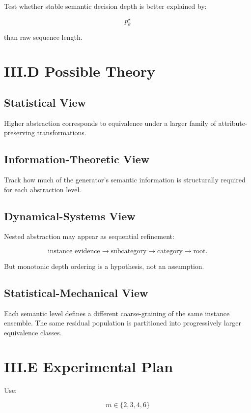 \documentclass[10pt]{article}
\begin{document}
Test whether stable semantic decision depth is better explained by:

\[
p_k^\star
\]

than raw sequence length.

\section{III.D Possible Theory}

\subsection{Statistical View}

Higher abstraction corresponds to equivalence under a larger family of attribute-preserving transformations.

\subsection{Information-Theoretic View}

Track how much of the generator's semantic information is structurally required for each abstraction level.

\subsection{Dynamical-Systems View}

Nested abstraction may appear as sequential refinement:

\[
\text{instance evidence}
\rightarrow
\text{subcategory}
\rightarrow
\text{category}
\rightarrow
\text{root}.
\]

But monotonic depth ordering is a hypothesis, not an assumption.

\subsection{Statistical-Mechanical View}

Each semantic level defines a different coarse-graining of the same instance ensemble. The same residual population is partitioned into progressively larger equivalence classes.

\section{III.E Experimental Plan}

Use:

\[
m\in\{2,3,4,6\}
\]
\end{document}
